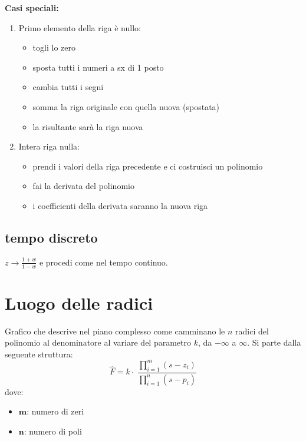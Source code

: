 \documentclass{report}
\theoremstyle{nostyle}
\begin{document}
\noindent
            \textbf{Casi speciali:}
            \begin{center}
            \begin{enumerate}
                \item Primo elemento della riga è nullo:
                \begin{itemize}
                    \item[-] togli lo zero
                    \item[-] sposta tutti i numeri a sx di 1 posto
                    \item[-] cambia tutti i segni
                    \item[-] somma la riga originale con quella nuova (spostata)
                    \item[-] la risultante sarà la riga nuova
                \end{itemize}

                \item  Intera riga nulla:
                \begin{itemize}
                    \item[-] prendi i valori della riga precedente e ci costruisci un polinomio
                    \item[-] fai la derivata del polinomio
                    \item[-] i coefficienti della derivata saranno la nuova riga
                \end{itemize}
            \end{enumerate}
        \end{center}


\subsection*{tempo discreto}
\begin{center}
    $z\to \displaystyle \frac{1+w}{1-w}$ e procedi come nel tempo continuo.
\end{center}


\section{Luogo delle radici}                   
Grafico che descrive nel piano complesso come camminano le $n$ radici del polinomio al denominatore al variare del parametro $k$, da $-\infty$ a $\infty$. Si parte dalla seguente struttura:
\[  \hat{F} =  k\cdot \ \frac{\displaystyle\prod_{i=1}^{m}(\displaystyle s-z_i)}{\displaystyle\prod_{i=1}^{n}(\displaystyle s-p_i)}   \]
dove:
\begin{itemize}
    \item $\bm{m}$: numero di zeri
    \item $\bm{n}$: numero di poli
\end{itemize}
\end{document}

